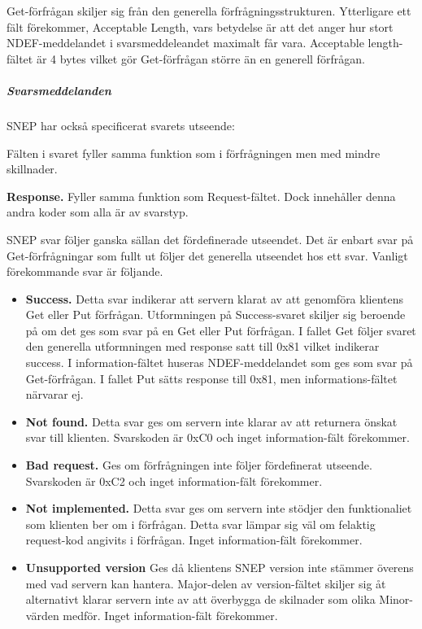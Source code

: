 \documentclass[11pt]{article}
\begin{document}
Get-förfrågan skiljer sig från den generella förfrågningsstrukturen. Ytterligare ett fält förekommer, Acceptable Length, vars betydelse är att det anger hur stort NDEF-meddelandet i svarsmeddeleandet maximalt får vara. Acceptable length-fältet är 4 bytes vilket gör Get-förfrågan större än en generell förfrågan.

\subparagraph{Svarsmeddelanden}
SNEP har också specificerat svarets utseende:


Fälten i svaret fyller samma funktion som i förfrågningen men med mindre skillnader.

\textbf{Response.} Fyller samma funktion som Request-fältet. Dock innehåller denna andra koder som alla är av svarstyp.

SNEP svar följer ganska sällan det fördefinerade utseendet. Det är enbart svar på Get-förfrågningar som fullt ut följer det generella utseendet hos ett svar. Vanligt förekommande svar är följande.

\begin{itemize}
\item \textbf{Success.} Detta svar indikerar att servern klarat av att genomföra klientens Get eller Put förfrågan. Utformningen på Success-svaret skiljer sig beroende på om det ges som svar på en Get eller Put förfrågan. I fallet Get följer svaret den generella utformningen med response satt till 0x81 vilket indikerar success. I information-fältet huseras NDEF-meddelandet som ges som svar på Get-förfrågan. I fallet Put sätts response till 0x81, men informations-fältet närvarar ej.
\item \textbf{Not found.} Detta svar ges om servern inte klarar av att returnera önskat svar till klienten. Svarskoden är 0xC0 och inget information-fält förekommer.
\item \textbf{Bad request.} Ges om förfrågningen inte följer fördefinerat utseende. Svarskoden är 0xC2 och inget information-fält förekommer.
\item \textbf{Not implemented.} Detta svar ges om servern inte stödjer den funktionaliet som klienten ber om i förfrågan. Detta svar lämpar sig väl om felaktig request-kod angivits i förfrågan. Inget information-fält förekommer.
\item \textbf{Unsupported version} Ges då klientens SNEP version inte stämmer överens med vad servern kan hantera. Major-delen av version-fältet skiljer sig åt alternativt klarar servern inte av att överbygga de skilnader som olika Minor-värden medför. Inget information-fält förekommer.
\end{itemize}
\end{document}
